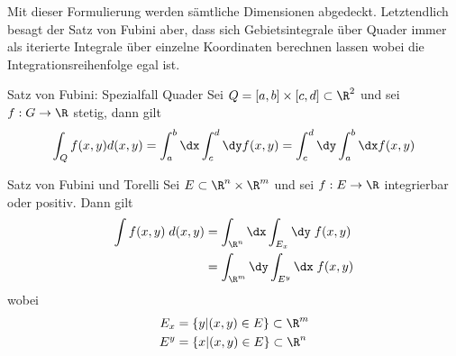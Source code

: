 	  \begin{bem}
	  	Mit dieser Formulierung werden sämtliche Dimensionen abgedeckt. Letztendlich besagt der Satz von Fubini aber, dass sich Gebietsintegrale über Quader immer als iterierte Integrale über einzelne Koordinaten berechnen lassen wobei die Integrationsreihenfolge egal ist.
	  \end{bem}
	  
	  \begin{satz}
	  Satz von Fubini: Spezialfall Quader\newline
	  Sei $Q = [a,b] \times [c,d] \subset \R^2$ und sei $f:G \to \R$ stetig, dann gilt
	  \begin{equation}
	  	\int_Q f(x,y) d(x,y) = \int_a^b \dx \int_c^d \dy f(x,y) = \int_c^d \dy \int_a^b \dx f(x,y)
	  \end{equation}
	  \end{satz}
	  
	  \begin{satz}
	  	Satz von Fubini und Torelli \newline
	  	Sei $E \subset \R^n \times \R^m$ und sei $f:E \to \R$ integrierbar oder positiv. Dann gilt
	  	\begin{align}
	  		\int f(x,y)\; d(x,y) &= \int_{\R^n} \dx \int_{E_x} \dy  \; f(x,y) \nonumber \\
	  		&= \int_{\R^m} \dy \int_{E^y} \dx  \; f(x,y)
	  	\end{align}
	  	wobei
	  	\begin{align}
	  		E_x &= \lbrace y | (x,y) \in E \rbrace \subset \R^m \nonumber \\
	  		E^y &= \lbrace x | (x,y) \in E \rbrace \subset \R^n \nonumber
	  	\end{align}
	  \end{satz}
	  
